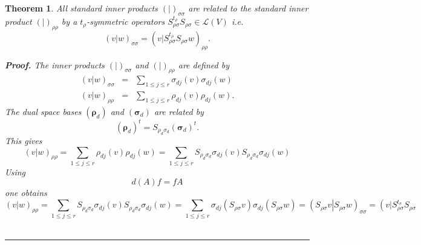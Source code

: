 \documentclass[aps,preprint]{revtex4}
\newtheorem{theorem}{Theorem}
\newenvironment{proof}[1][Proof]{\noindent\textbf{#1.} }{\ \rule{0.5em}{0.5em}}
\begin{document}
\begin{theorem}
All standard inner products $\left( \left. {}\right\vert \right) _{\sigma
\sigma }$ are related to the standard inner product $\left( \left.
{}\right\vert \right) _{\rho \rho }$ by a $t_{\rho }$-symmetric operators $%
S_{\rho \sigma }^{t_{\rho }}S_{\rho \sigma }\in \mathcal{L}\left( V\right) $
i.e. 
\begin{equation}
\left( \left. v\right\vert w\right) _{\sigma \sigma }=\left( \left.
v\right\vert S_{\rho \sigma }^{t_{\rho }}S_{\rho \sigma }w\right) _{\rho
\rho }.
\end{equation}

\begin{proof}
The inner products $\left( \left. {}\right\vert \right) _{\sigma \sigma }$
and $\left( \left. {}\right\vert \right) _{\rho \rho }$ are defined by 
\begin{eqnarray}
\left( \left. v\right\vert w\right) _{\sigma \sigma } &=&\sum_{1\leq j\leq
r}\sigma _{dj}\left( v\right) \sigma _{dj}\left( w\right) \\
\left( \left. v\right\vert w\right) _{\rho \rho } &=&\sum_{1\leq j\leq
r}\rho _{dj}\left( v\right) \rho _{dj}\left( w\right) .
\end{eqnarray}%
The dual space bases $\left( \boldsymbol{\rho }_{d}\right) $ and $\left( 
\boldsymbol{\sigma }_{d}\right) $ are related by 
\begin{equation}
\left( \boldsymbol{\rho }_{d}\right) ^{t}=S_{\rho _{d}\sigma _{d}}\left( 
\boldsymbol{\sigma }_{d}\right) ^{t}.
\end{equation}%
This gives 
\begin{equation}
\left( \left. v\right\vert w\right) _{\rho \rho }=\sum_{1\leq j\leq r}\rho
_{dj}\left( v\right) \rho _{dj}\left( w\right) =\sum_{1\leq j\leq r}S_{\rho
_{d}\sigma _{d}}\sigma _{dj}\left( v\right) S_{\rho _{d}\sigma _{d}}\sigma
_{dj}\left( w\right)
\end{equation}%
Using 
\begin{equation}
d\left( A\right) f=fA
\end{equation}%
one obtains 
\begin{equation}
\left( \left. v\right\vert w\right) _{\rho \rho }=\sum_{1\leq j\leq
r}S_{\rho _{d}\sigma _{d}}\sigma _{dj}\left( v\right) S_{\rho _{d}\sigma
_{d}}\sigma _{dj}\left( w\right) =\sum_{1\leq j\leq r}\sigma _{dj}\left(
S_{\rho \sigma }v\right) \sigma _{dj}\left( S_{\rho \sigma }w\right) =\left(
\left. S_{\rho \sigma }v\right\vert S_{\rho \sigma }w\right) _{\sigma \sigma
}=\left( \left. v\right\vert S_{\rho \sigma }^{t_{\sigma }}S_{\rho \sigma
}
\end{equation}
\end{proof}
\end{theorem}
\end{document}

